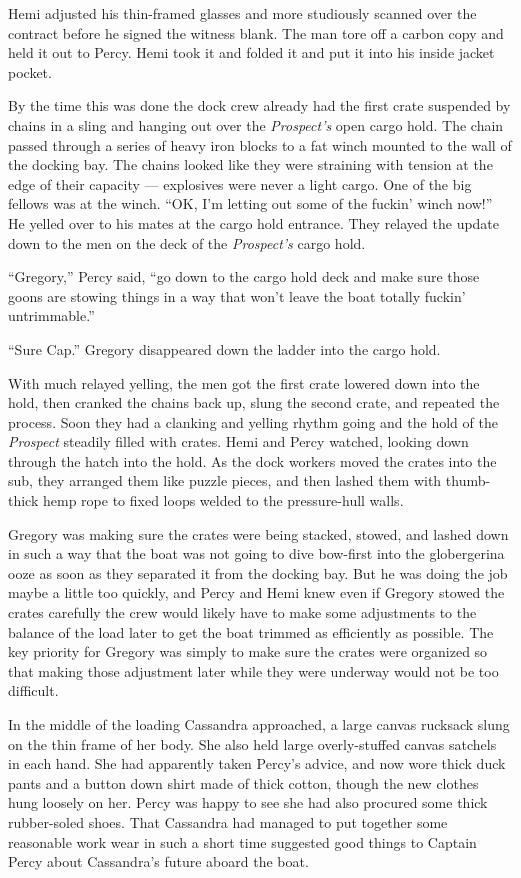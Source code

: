 \documentclass[]{scrbook}
\begin{document}
Hemi adjusted his thin-framed glasses and more studiously scanned over
the contract before he signed the witness blank. The man tore off a
carbon copy and held it out to Percy. Hemi took it and folded it and put
it into his inside jacket pocket.

By the time this was done the dock crew already had the first crate
suspended by chains in a sling and hanging out over the
\emph{Prospect's} open cargo hold. The chain passed through a series of
heavy iron blocks to a fat winch mounted to the wall of the docking bay.
The chains looked like they were straining with tension at the edge of
their capacity --- explosives were never a light cargo. One of the big
fellows was at the winch. ``OK, I'm letting out some of the fuckin'
winch now!'' He yelled over to his mates at the cargo hold entrance.
They relayed the update down to the men on the deck of the
\emph{Prospect's} cargo hold.

``Gregory,'' Percy said, ``go down to the cargo hold deck and make sure
those goons are stowing things in a way that won't leave the boat
totally fuckin' untrimmable.''

``Sure Cap.'' Gregory disappeared down the ladder into the cargo hold.

With much relayed yelling, the men got the first crate lowered down into
the hold, then cranked the chains back up, slung the second crate, and
repeated the process. Soon they had a clanking and yelling rhythm going
and the hold of the \emph{Prospect} steadily filled with crates. Hemi
and Percy watched, looking down through the hatch into the hold. As the
dock workers moved the crates into the sub, they arranged them like
puzzle pieces, and then lashed them with thumb-thick hemp rope to fixed
loops welded to the pressure-hull walls.

Gregory was making sure the crates were being stacked, stowed, and
lashed down in such a way that the boat was not going to dive bow-first
into the globergerina ooze as soon as they separated it from the docking
bay. But he was doing the job maybe a little too quickly, and Percy and
Hemi knew even if Gregory stowed the crates carefully the crew would
likely have to make some adjustments to the balance of the load later to
get the boat trimmed as efficiently as possible. The key priority for
Gregory was simply to make sure the crates were organized so that making
those adjustment later while they were underway would not be too
difficult.

In the middle of the loading Cassandra approached, a large canvas
rucksack slung on the thin frame of her body. She also held large
overly-stuffed canvas satchels in each hand. She had apparently taken
Percy's advice, and now wore thick duck pants and a button down shirt
made of thick cotton, though the new clothes hung loosely on her. Percy
was happy to see she had also procured some thick rubber-soled shoes.
That Cassandra had managed to put together some reasonable work wear in
such a short time suggested good things to Captain Percy about
Cassandra's future aboard the boat.
\end{document}
